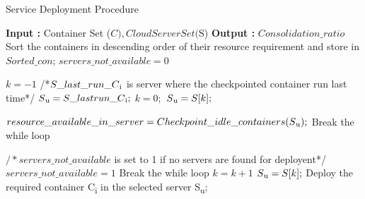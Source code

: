 \begin{algorithm}
\caption{Service Deployment Procedure}
\begin{algorithmic}[1]
\State \textbf{Input : } Container Set ($C), Cloud Server Set ($S)
\State \textbf{Output : } \begin{math}Consolidation\_ratio \end{math}
    \State Sort the containers in descending order of their
resource requirement and store in \begin{math}Sorted\_con\end{math};
 \begin{math} servers\_not\_available = 0\end{math} \EndFor
    
     \State \begin{math}k = -1\end{math} 
\State /*\begin{math}S\_last\_run\_C\textsubscript{i}\end{math} is server where the checkpointed container run last time*/
\State \begin{math}S\textsubscript{u} = S\_last run\_C\textsubscript{i};\end{math}
\Else
\State \begin{math}k = 0;\end{math}
\State \begin{math}S\textsubscript{u} = S[k];\end{math}
    \EndIf

          \State \begin{math}resource\_available\_in\_server =
Checkpoint\_idle\_containers(S\textsubscript{u});\end{math} 
\State Break the while loop

    \EndIf
  \State \begin{math}/*servers\_not\_available\end{math} is set
to 1 if no servers are
found for deployent*/
\State \begin{math}servers\_not\_available = 1\end{math}
\State Break the while loop
\Else
\State  \begin{math}k = k + 1\end{math}
\State \begin{math}S\textsubscript{u} = S[k];\end{math}
    \EndIf
 \If{$servers\_not\_available \neq 1$} \State Deploy the required container C\textsubscript{i} in the selected
server S\textsubscript{u};


\end{algorithmic}
\end{algorithm}
